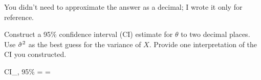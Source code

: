 \documentclass[12pt]{article}
\begin{document}
\begin{enumerate}[(a)]
You didn't need to approximate the answer as a decimal; I wrote it only for reference.
\color{black}



 Construct a 95\% confidence interval (CI) estimate for $\theta$ to two decimal places. Use $\hat{\sigma}^2$ as the best guess for the variance of $X$. Provide one interpretation of the CI you constructed.\color{blue}

\beqn
CI_{\theta, 95\%} =  \approx {} = 
\eeqn

\color{black}

\end{enumerate}
\end{document}
